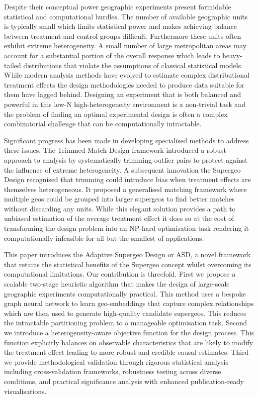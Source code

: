 \documentclass[final,3p,fleqn, 10pt]{elsarticle}
\begin{document}
Despite their conceptual power geographic experiments present formidable statistical and computational hurdles. The number of available geographic units is typically small which limits statistical power and makes achieving balance between treatment and control groups difficult. Furthermore these units often exhibit extreme heterogeneity. A small number of large metropolitan areas may account for a substantial portion of the overall response which leads to heavy-tailed distributions that violate the assumptions of classical statistical models. While modern analysis methods have evolved to estimate complex distributional treatment effects the design methodologies needed to produce data suitable for them have lagged behind. Designing an experiment that is both balanced and powerful in this low-N high-heterogeneity environment is a non-trivial task and the problem of finding an optimal experimental design is often a complex combinatorial challenge that can be computationally intractable.

Significant progress has been made in developing specialised methods to address these issues. The Trimmed Match Design framework introduced a robust approach to analysis by systematically trimming outlier pairs to protect against the influence of extreme heterogeneity. A subsequent innovation the Supergeo Design recognised that trimming could introduce bias when treatment effects are themselves heterogeneous. It proposed a generalised matching framework where multiple geos could be grouped into larger supergeos to find better matches without discarding any units. While this elegant solution provides a path to unbiased estimation of the average treatment effect it does so at the cost of transforming the design problem into an NP-hard optimisation task rendering it computationally infeasible for all but the smallest of applications.

This paper introduces the Adaptive Supergeo Design or ASD, a novel framework that retains the statistical benefits of the Supergeo concept whilst overcoming its computational limitations. Our contribution is threefold. First we propose a scalable two-stage heuristic algorithm that makes the design of large-scale geographic experiments computationally practical. This method uses a bespoke graph neural network to learn geo-embeddings that capture complex relationships which are then used to generate high-quality candidate supergeos. This reduces the intractable partitioning problem to a manageable optimisation task. Second we introduce a heterogeneity-aware objective function for the design process. This function explicitly balances on observable characteristics that are likely to modify the treatment effect leading to more robust and credible causal estimates. Third we provide methodological validation through rigorous statistical analysis including cross-validation frameworks, robustness testing across diverse conditions, and practical significance analysis with enhanced publication-ready visualisations.
\end{document}
